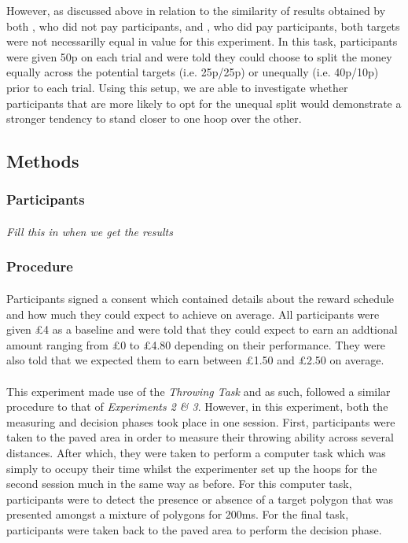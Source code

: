 \documentclass[12pt]{article}
\begin{document}
\pararaph{} However, as discussed above in relation to the similarity of results obtained by both \cite{clarke2015failure}, who did not pay participants, and \cite{morvan2012human}, who did pay participants, both targets were not necessarilly equal in value for this experiment. In this task, participants were given 50p on each trial and were told they could choose to split the money equally across the potential targets (i.e. 25p/25p) or unequally (i.e. 40p/10p) prior to each trial. Using this setup, we are able to investigate whether participants that are more likely to opt for the unequal split would demonstrate a stronger tendency to stand closer to one hoop over the other.  

\subsection*{Methods}
\subsubsection*{Participants}
\paragraph{} \textit{Fill this in when we get the results}

\subsubsection*{Procedure} 
\paragraph{} Participants signed a consent which contained details about the reward schedule and how much they could expect to achieve on average. All participants were given £4 as a baseline and were told that they could expect to earn an addtional amount ranging from £0 to £4.80 depending on their performance. They were also told that we expected them to earn between £1.50 and £2.50 on average.  

\paragraph{} This experiment made use of the \textit{Throwing Task} and as such, followed a similar procedure to that of \textit{Experiments 2 \& 3}. However, in this experiment, both the measuring and decision phases took place in one session. First, participants were taken to the paved area in order to measure their throwing ability across several distances. After which, they were taken to perform a computer task which was simply to occupy their time whilst the experimenter set up the hoops for the second session much in the same way as before. For this computer task, participants were to detect the presence or absence of a target polygon that was presented amongst a mixture of polygons for 200ms. For the final task, participants were taken back to the paved area to perform the decision phase. 
\end{document}
